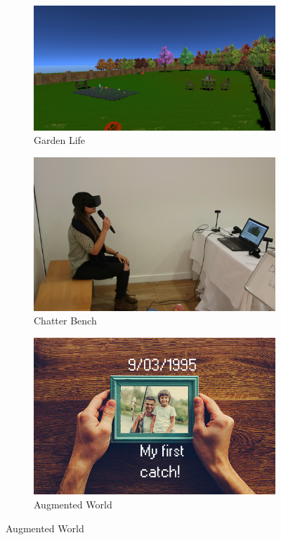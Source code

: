 \begin{figure}[htbp]
\begin{subfigure}[t]{0.3\textwidth}
    \includegraphics[width=\linewidth]{Images/GardenLife.png}
\caption{Garden Life}
\label{fig:gardenLife}
\end{subfigure}\hfill
\begin{subfigure}[t]{0.3\textwidth}
  \includegraphics[width=\linewidth]{Images/ChatterBench.png}
\caption{Chatter Bench}
\label{fig:ChatterBench}
\end{subfigure}\hfill
\begin{subfigure}[t]{0.3\textwidth}
    \includegraphics[width=\linewidth]{Images/AugmentedWorld.png}
\caption{Augmented World}
\label{fig:AugmentedWorld}
\end{subfigure}


\end{figure}

